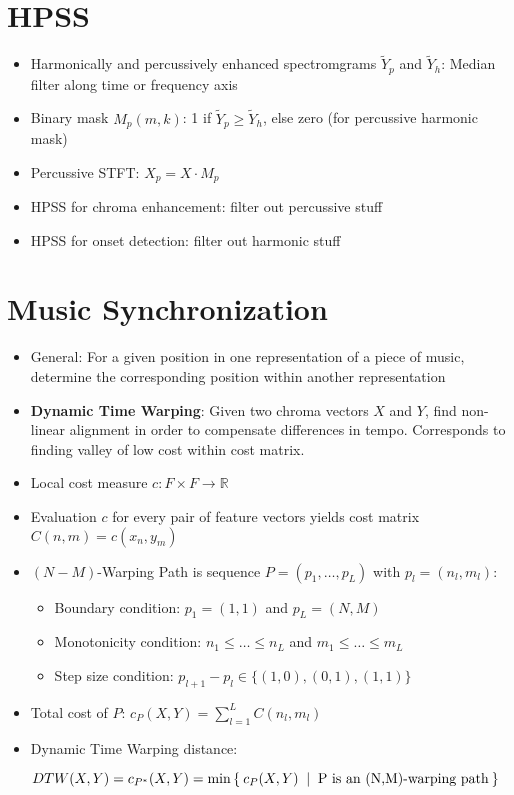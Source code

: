 \documentclass{scrartcl}
\begin{document}
\section{HPSS}
\begin{itemize}
    \item
        Harmonically and percussively enhanced spectromgrams $\tilde{Y}_p$ and $\tilde{Y}_h$: Median filter along time or frequency axis
    \item
        Binary mask $M_p(m,k)$: 1 if $\tilde{Y}_p \geq \tilde{Y}_h$, else zero (for percussive harmonic mask)
    \item
        Percussive STFT: $X_p = X \cdot M_p$
    \item
        HPSS for chroma enhancement: filter out percussive stuff
    \item
        HPSS for onset detection: filter out harmonic stuff
\end{itemize}

\section{Music Synchronization}
\begin{itemize}
    \item
        General: For a given position in one representation of a piece of music, determine the corresponding position within another representation
    \item
        \textbf{Dynamic Time Warping}: Given two chroma vectors $X$ and $Y$, find non-linear alignment in order to compensate differences in tempo. Corresponds to finding valley of low cost within cost matrix.
    \item
        Local cost measure $c: F \times F \rightarrow \mathbb{R}$
    \item
        Evaluation $c$ for every pair of feature vectors yields cost matrix $C(n,m) = c(x_n, y_m)$
    \item
        $(N-M)$-Warping Path is sequence $P=(p_1, \dots, p_L)$ with $p_l = (n_l, m_l)$:
			\marginpar{\Huge ! \hfill}
        \begin{itemize}
            \item
                Boundary condition: $p_1 = (1,1)$ and $p_L = (N,M)$
            \item
                Monotonicity condition: $n_1 \leq \dots \leq n_L$ and $m_1 \leq \dots \leq m_L$
            \item
                Step size condition: $p_{l+1} - p_l \in \{(1,0), (0,1), (1,1)\}$
        \end{itemize}
    \item
        Total cost of $P$: $c_P(X,Y) = \sum_{l=1}^{L} C(n_l, m_l)$
    \item
			Dynamic Time Warping distance: 
			
			$ DTW(X,Y) = c_{P^*}(X,Y) = \min\Set{c_P (X,Y) \; | \; \text{P is an (N,M)-warping path}}$
\end{itemize}
\end{document}
